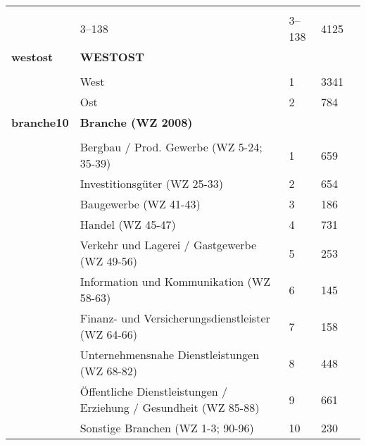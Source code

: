 \begin{longtable}{| L{2.5cm} | L{8.25cm}| C{1.5cm} | R{1.25cm} | C{2.25cm} |  }
   &  &  &  &  \\ 
   & 3--138 & 3--138 & 4125 &  \\ 
   \midrule
\textbf{westost}\label{var:suf:westost} & \textbf{WESTOST} &  &  &  \\ 
   &  &  &  &  \\ 
   & West & 1 & 3341 &  \\ 
   & Ost & 2 & 784 &  \\ 
   \midrule
\textbf{branche10}\label{var:suf:branche10} & \textbf{Branche (WZ 2008)} &  &  &  \\ 
   &  &  &  &  \\ 
   & Bergbau / Prod. Gewerbe (WZ 5-24; 35-39) & 1 & 659 &  \\ 
   & Investitionsgüter (WZ 25-33) & 2 & 654 &  \\ 
   & Baugewerbe (WZ 41-43) & 3 & 186 &  \\ 
   & Handel (WZ 45-47) & 4 & 731 &  \\ 
   & Verkehr und Lagerei / Gastgewerbe (WZ 49-56) & 5 & 253 &  \\ 
   & Information und Kommunikation (WZ 58-63) & 6 & 145 &  \\ 
   & Finanz- und Versicherungsdienstleister (WZ 64-66) & 7 & 158 &  \\ 
   & Unternehmensnahe Dienstleistungen (WZ 68-82) & 8 & 448 &  \\ 
   & Öffentliche Dienstleistungen / Erziehung / Gesundheit (WZ 85-88) & 9 & 661 &  \\ 
   & Sonstige Branchen (WZ 1-3; 90-96) & 10 & 230 &  \\ 
  
\end{longtable}
